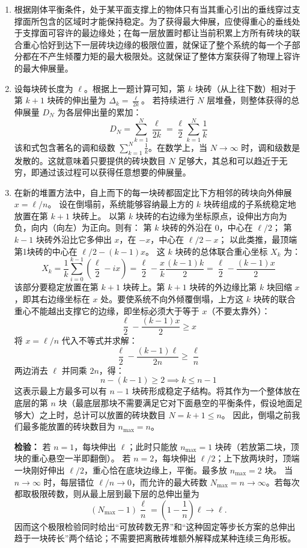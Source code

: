 \begin{solution}
\begin{enumerate}
    \item[(a)] 根据刚体平衡条件，处于某平面支撑上的物体只有当其重心引出的垂线穿过支撑面所包含的区域时才能保持稳定。为了获得最大伸展，应使得重心的垂线处于支撑面可容许的最边缘处；在每一层放置时都让当前积累上方所有砖块的联合重心恰好到达下一层砖块边缘的极限位置，就保证了整个系统的每一个子部分都在不产生倾覆力矩的最大极限处。这就保证了整体方案获得了物理上容许的最大伸展量。

    \item[(b)] 设每块砖长度为 $\ell$。根据上一题计算可知，第 $k$ 块砖（从上往下数）相对于第 $k+1$ 块砖的伸出量为 $\Delta_k = \frac{\ell}{2k}$。
    若持续进行 $N$ 层堆叠，则整体获得的总伸展量 $D_N$ 为各层伸出量的累加：
    $$ D_N = \sum_{k=1}^N \frac{\ell}{2k} = \frac{\ell}{2} \sum_{k=1}^N \frac{1}{k} $$
    该和式包含著名的调和级数 $\sum_{k=1}^N \frac{1}{k}$。在数学上，当 $N \to \infty$ 时，调和级数是发散的。这就意味着只要提供的砖块数目 $N$ 足够大，其总和可以趋近于无穷，即通过该过程可以获得任意想要的伸展量。

    \item[(c)] 在新的堆置方法中，自上而下的每一块砖都固定比下方相邻的砖块向外伸展 $x = \ell/n$。
    设在倒塌前，系统能够容纳最上方的 $k$ 块砖组成的子系统稳定地放置在第 $k+1$ 块砖上。
    以第 $k$ 块砖的右边缘为坐标原点，设伸出方向为负，向内（向左）为正向。则有：
    第 $k$ 块砖的外沿在 $0$，中心在 $\ell/2$；
    第 $k-1$ 块砖外沿比它多伸出 $x$，在 $-x$，中心在 $\ell/2 - x$；
    以此类推，最顶端第1块砖的中心在 $\ell/2 - (k-1)x$。
    这 $k$ 块砖的总体联合重心坐标 $X_k$ 为：
    $$ X_k = \frac{1}{k} \sum_{i=0}^{k-1} \left( \frac{\ell}{2} - i x \right) = \frac{\ell}{2} - \frac{x}{k} \frac{(k-1)k}{2} = \frac{\ell}{2} - \frac{(k-1)x}{2} $$
    该部分要稳定放置在第 $k+1$ 块砖上。第 $k+1$ 块砖的外边缘比第 $k$ 块回缩 $x$，即其右边缘坐标在 $x$ 处。要使系统不向外倾覆倒塌，上方这 $k$ 块砖的联合重心不能越出支撑它的边缘，即坐标必须大于等于 $x$（不要太靠外）：
    $$ \frac{\ell}{2} - \frac{(k-1)x}{2} \ge x $$
    将 $x = \ell/n$ 代入不等式并求解：
    $$ \frac{\ell}{2} - \frac{(k-1)\ell}{2n} \ge \frac{\ell}{n} $$
    两边消去 $\ell$ 并同乘 $2n$，得：
    $$ n - (k - 1) \ge 2 \implies k \le n - 1 $$
    这表示最上方最多可以有 $n-1$ 块砖形成稳定子结构。将其作为一个整体放在底层的第 $n$ 块（最底层那块不需要满足它对下面悬空的平衡条件，假设地面足够大）之上时，总计可以放置的砖块数目 $N = k + 1 \le n$。
    因此，倒塌之前我们最多能放置的砖块数目为 $n_{\max} = n$。

    \textbf{检验：}
    若 $n=1$，每块伸出 $\ell$；此时只能放 $n_{\max}=1$ 块砖（若放第二块，顶块的重心悬空一半即翻倒）。
    若 $n=2$，每块伸出 $\ell/2$；上下放两块时，顶端一块刚好伸出 $\ell/2$，重心恰在底块边缘上，平衡。最多放 $n_{\max}=2$ 块。
    当 $n\to\infty$ 时，每层错位 $\ell/n\to0$，而允许的最大砖数 $N_{\max}=n\to\infty$。若每次都取极限砖数，则从最上层到最下层的总伸出量为
    $$ (N_{\max}-1)\frac{\ell}{n}=\left(1-\frac1n\right)\ell\longrightarrow\ell. $$
    因而这个极限检验同时给出“可放砖数无界”和“这种固定等步长方案的总伸出趋于一块砖长”两个结论；不需要把离散砖堆额外解释成某种连续三角形板。
\end{enumerate}
\end{solution}

